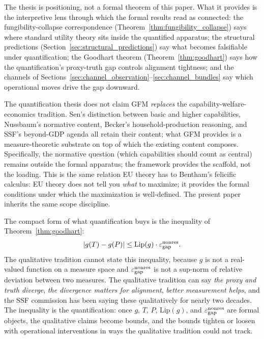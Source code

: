 The thesis is positioning, not a formal theorem of this paper.
What it provides is the interpretive lens through which the
formal results read as connected: the
fungibility-collapse correspondence
(Theorem~\ref{thm:fungibility_collapse}) says where standard utility
theory sits inside the quantified apparatus; the structural
predictions (Section~\ref{sec:structural_predictions}) say what
becomes falsifiable under quantification; the Goodhart theorem
(Theorem~\ref{thm:goodhart}) says how the quantification's
proxy-truth gap controls alignment tightness; and the channels of
Sections~\ref{sec:channel_observation}--\ref{sec:channel_bundles}
say which operational moves drive the gap downward.

\begin{remark}
\label{rem:not_replacing}
The quantification thesis does not claim GFM \emph{replaces} the
capability-welfare-economics tradition.  Sen's distinction between
basic and higher capabilities, Nussbaum's normative content,
Becker's household-production reasoning, and SSF's beyond-GDP
agenda all retain their content; what GFM provides is a
measure-theoretic substrate on top of which the existing
content composes.  Specifically, the normative question (which
capabilities should count as central) remains outside the formal
apparatus; the framework provides the scaffold, not the loading.
This is the same relation EU theory has to Bentham's felicific
calculus: EU theory does not tell you \emph{what} to maximize;
it provides the formal conditions under which the maximization is
well-defined.  The present paper inherits the same scope discipline.
\end{remark}

\begin{remark}
\label{rem:quantification_buys}
The compact form of what quantification buys is the inequality of
Theorem~\ref{thm:goodhart}:
\[
  | g(T) - g(P) | \leq \mathrm{Lip}(g) \cdot \varepsilon_{\mathrm{gap}}^{\mathrm{nonres}}.
\]
The qualitative tradition cannot state this inequality, because
$g$ is not a real-valued function on a measure space and $\varepsilon_{\mathrm{gap}}^{\mathrm{nonres}}$
is not a sup-norm of relative deviation between two measures.  The
qualitative tradition can say \emph{the proxy and truth diverge},
\emph{the divergence matters for alignment}, \emph{better measurement
helps}, and the SSF commission has been saying these qualitatively
for nearly two decades.  The inequality is the quantification:
once $g$, $T$, $P$, $\mathrm{Lip}(g)$, and $\varepsilon_{\mathrm{gap}}^{\mathrm{nonres}}$ are
formal objects, the qualitative claims become bounds, and the
bounds tighten or loosen with operational interventions in ways
the qualitative tradition could not track.
\end{remark}

